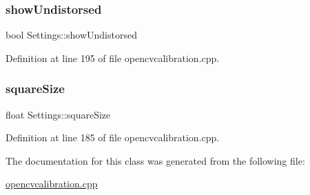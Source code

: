 \mbox{\label{classSettings_a935d6f27ee454e9fee63f8b662f48a06}} 
\subsubsection{\texorpdfstring{showUndistorsed}{showUndistorsed}}
{\footnotesize\ttfamily bool Settings\+::show\+Undistorsed}



Definition at line 195 of file opencvcalibration.\+cpp.

\mbox{\label{classSettings_a6c94708776ad1ce258fc44f2101f5941}} 
\subsubsection{\texorpdfstring{squareSize}{squareSize}}
{\footnotesize\ttfamily float Settings\+::square\+Size}



Definition at line 185 of file opencvcalibration.\+cpp.



The documentation for this class was generated from the following file\+:\begin{DoxyCompactItemize}
\item 
\mbox{\hyperlink{opencvcalibration_8cpp}{opencvcalibration.\+cpp}}\end{DoxyCompactItemize}
